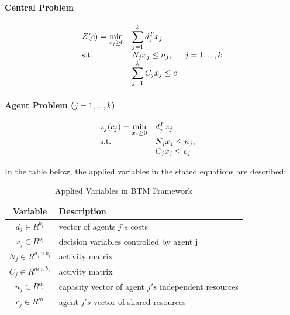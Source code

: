 \paragraph*{Central Problem}
\begin{equation}
\label{eq:central_problem}
 \begin{array}{ll@{}ll}
 Z(c) = \underset{x_{j} \geq 0}{\text{min}} & \displaystyle\sum\limits_{j=1}^{k} d^{T}_{j}x_{j} &\\
 \text{s.t.}& \displaystyle N_{j}x_{j} \leq n_{j}, &&j=1 ,..., k \\
 & \displaystyle\sum\limits_{j=1}^{k} C_{j}x_{j} \leq c
 \end{array}
\end{equation}

\paragraph*{Agent Problem ($j=1, ..., k$)}
\begin{equation}
    \label{eq:agent_problem}
 \begin{array}{ll@{}ll}
 z_{j}(c_{j}) = \underset{x_{j} \geq 0}{\text{min}} & \displaystyle d^{T}_{j}x_{j} &\\
 \text{s.t.}& \displaystyle N_{j}x_{j} \leq n_{j}, &&\\
 & \displaystyle C_{j}x_{j} \leq c_{j}
 \end{array}
\end{equation}

In the table below, the applied variables in the stated equations are described:


\begin{longtable}{c|l}
    \caption{Applied Variables in BTM Framework}
    \label{table:applied_variables_in_btm}
    \\
    \textbf{Variable} & \textbf{Description} \\
	\hline
    $d_{j} \in R^{b_{j}}$ & vector of agents $j's$ costs \\
    $x_{j} \in R^{b_{j}}$ & decision variables controlled by agent j \\
    $N_{j} \in R^{a_{j} \times b_{j}}$ & activity matrix \\
    $C_{j} \in R^{m \times b_{j}}$ & activity matrix \\
    $n_{j} \in R^{a_{j}}$ & capacity vector of agent $j's$ independent resources \\
    $c_{j} \in R^{m}$ & agent $j's$ vector of shared resources \\
\end{longtable} 

